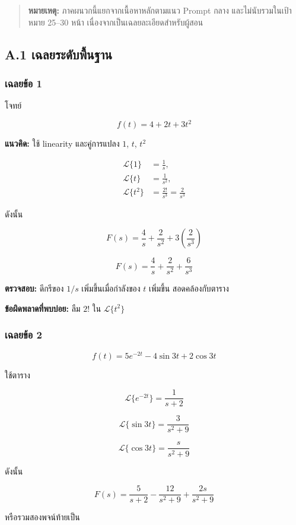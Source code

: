 \begin{quote}
\textbf{หมายเหตุ:} ภาคผนวกนี้แยกจากเนื้อหาหลักตามแนว Prompt กลาง และไม่นับรวมในเป้าหมาย 25–30 หน้า เนื่องจากเป็นเฉลยละเอียดสำหรับผู้สอน
\end{quote}

\subsection{A.1 เฉลยระดับพื้นฐาน}

\subsubsection{เฉลยข้อ 1}

โจทย์

\[
f(t)=4+2t+3t^2
\]

\textbf{แนวคิด:} ใช้ linearity และคู่การแปลง $1$, $t$, $t^2$

\[
\begin{aligned}
    \mathcal{L}\{1\}&=\frac{1}{s},\quad\\
    \mathcal{L}\{t\}&=\frac{1}{s^2},\quad\\
    \mathcal{L}\{t^2\}&=\frac{2!}{s^3}=\frac{2}{s^3}
\end{aligned}
\]

ดังนั้น

\[
F(s)=\frac{4}{s}+\frac{2}{s^2}+3\left(\frac{2}{s^3}\right)
\]

\[
\boxed{F(s)=\frac{4}{s}+\frac{2}{s^2}+\frac{6}{s^3}}
\]

\textbf{ตรวจสอบ:} ดีกรีของ $1/s$ เพิ่มขึ้นเมื่อกำลังของ $t$ เพิ่มขึ้น สอดคล้องกับตาราง

\textbf{ข้อผิดพลาดที่พบบ่อย:} ลืม $2!$ ใน $\mathcal{L}\{t^2\}$

\subsubsection{เฉลยข้อ 2}

\[
f(t)=5e^{-2t}-4\sin 3t+2\cos 3t
\]

ใช้ตาราง

\[
\mathcal{L}\{e^{-2t}\}=\frac{1}{s+2}
\]

\[
\mathcal{L}\{\sin 3t\}=\frac{3}{s^2+9}
\]

\[
\mathcal{L}\{\cos 3t\}=\frac{s}{s^2+9}
\]

ดังนั้น

\[
\boxed{F(s)=\frac{5}{s+2}-\frac{12}{s^2+9}+\frac{2s}{s^2+9}}
\]

หรือรวมสองพจน์ท้ายเป็น

